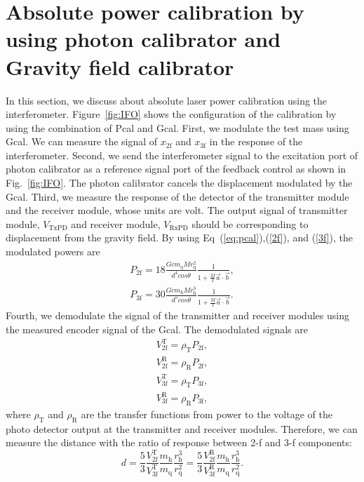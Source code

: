 \documentclass[%
 reprint,
superscriptaddress,
 amsmath,amssymb,
 aps,
]{revtex4-1}
\begin{document}
\section{Absolute power calibration by using photon calibrator and Gravity field calibrator} \label{sec:PGCAL}
In this section, we discuss about absolute laser power calibration using the interferometer. 
Figure~\ref{fig:IFO} shows the configuration of the calibration by using the combination of Pcal and Gcal.
First, we modulate the test mass using Gcal. We can measure the signal of $x_{\mathrm{2f}}$ and $x_{\mathrm{3f}}$ in the response of the interferometer. Second, we send the interferometer signal to the excitation port of photon calibrator as a reference signal port of the feedback control as shown in Fig.~\ref{fig:IFO}. The photon calibrator cancels the displacement modulated by the Gcal. Third, we measure the response of the detector of the transmitter module and the receiver module, whose units are volt. The output signal of transmitter module, $V_{\mathrm{TxPD}}$ and receiver module, $V_{\mathrm{RxPD}}$ should be corresponding to displacement from the gravity field. By using Eq~(\ref{eq:pcal}),(\ref{2f}), and (\ref{3f}), the modulated powers are
\begin{eqnarray}
 P_{\mathrm{2f}}=18 \frac{Gcm_{\mathrm{q}}Mr_{\mathrm{q}}^2}{d^4cos\theta}\frac{1}{1+\frac{M}{I}\vec{a}\cdot \vec{b}}, \label{P2f} \\
 P_{\mathrm{3f}}= 30\frac{Gcm_{\mathrm{h}}Mr_{\mathrm{h}}^3}{d^5cos\theta}\frac{1}{1+\frac{M}{I}\vec{a}\cdot \vec{b}}. \label{P3f}
\end{eqnarray}
Fourth, we demodulate the signal of the transmitter and receiver modules using the measured encoder signal of the Gcal.
The demodulated signals are 
\begin{eqnarray}
V_{\mathrm{2f}}^{\mathrm{T}}=\rho_{\mathrm{T}}P_{\mathrm{2f}}, \\
V_{\mathrm{2f}}^{\mathrm{R}}=\rho_{\mathrm{R}}P_{\mathrm{2f}}, \\
V_{\mathrm{3f}}^{\mathrm{T}}=\rho_{\mathrm{T}}P_{\mathrm{3f}}, \\
V_{\mathrm{3f}}^{\mathrm{R}}=\rho_{\mathrm{R}}P_{\mathrm{3f}}, 
\end{eqnarray} 
where $\rho_{\mathrm{T}}$ and $\rho_{\mathrm{R}}$ are the transfer functions from power to the voltage of the photo detector output at the transmitter and receiver modules.
Therefore, we can measure the distance with the ratio of response between 2-f and 3-f components: 
\begin{equation}
d=\frac{5}{3} \frac{V_{\mathrm{2f}}^{\mathrm{T}}}{V_{\mathrm{3f}}^{\mathrm{T}}}\frac{m_{\mathrm{h}}}{m_{\mathrm{q}}}\frac{r_{\mathrm{h}}^{3}}{r_{\mathrm{q}}^{2}}=\frac{5}{3} \frac{V_{\mathrm{2f}}^{\mathrm{R}}}{V_{\mathrm{3f}}^{\mathrm{R}}} \frac{m_{\mathrm{h}}}{m_{\mathrm{q}}}\frac{r_{\mathrm{h}}^{3}}{r_{\mathrm{q}}^{2}}. \label{d}
\end{equation}
\end{document}
